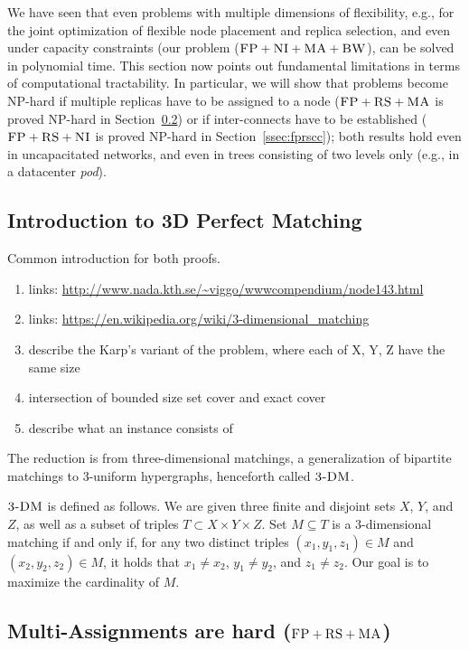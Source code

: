 We have seen that even problems with multiple dimensions of
flexibility, e.g., for the joint optimization of flexible node
placement and replica selection, and even under capacity constraints
(our problem ($\textsc{FP}+\textsc{NI}+\textsc{MA}+\textsc{BW}$), can be solved in polynomial time.
This section now points out fundamental limitations in terms of
computational tractability. In particular, we will show that problems
become NP-hard if multiple replicas have to be assigned to a node
($\textsc{FP}+\textsc{RS}+\textsc{MA}$ is proved NP-hard in Section~\ref{ssec:fprsma}) or if
inter-connects have to be established ($\textsc{FP}+\textsc{RS}+\textsc{NI}$ is proved NP-hard
in Section~\ref{ssec:fprscc}); both results hold even in uncapacitated
networks, and even in trees consisting of two levels only (e.g.,
in a datacenter \emph{pod}).

\subsection{Introduction to 3D Perfect Matching}

Common introduction for both proofs.

\begin{enumerate}
\item links: \url{http://www.nada.kth.se/~viggo/wwwcompendium/node143.html}
\item links: \url{https://en.wikipedia.org/wiki/3-dimensional_matching}
\item describe the Karp's variant of the problem, where each of X, Y, Z have the same size
\item intersection of bounded size set cover and exact cover
\item describe what an instance consists of
\end{enumerate}

The reduction is from three-dimensional matchings, a generalization of bipartite matchings
to 3-uniform hypergraphs, henceforth called
$\textsc{3-DM}$.~\cite{3dmatch}

$\textsc{3-DM}$ is defined as follows. We are given three finite and disjoint sets $X$, $Y$, and $Z$,
as well as a subset of triples $T\subset X \times Y \times Z$.
Set $M \subseteq T$ is a 3-dimensional matching if and only if,
for any two distinct triples $(x_1, y_1, z_1) \in M$ and $(x_2, y_2, z_2) \in M$,
it holds that $x_1\neq x_2$, $y_1\neq y_2$, and $z_1\neq z_2$. Our goal is to
maximize the cardinality of $M$.


\subsection{Multi-Assignments are hard ($\textsc{FP}+\textsc{RS}+\textsc{MA}$)}\label{ssec:fprsma}

